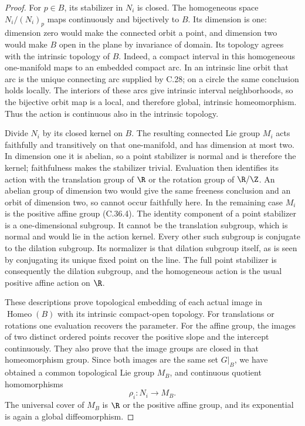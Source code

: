 \begin{proof}
For $p\in B$, its stabilizer in $N_i$ is
closed. The homogeneous space
$N_i/(N_i)_p$ maps continuously and
bijectively to $B$. Its dimension is one:
dimension zero would make the connected
orbit a point, and dimension two would make
$B$ open in the plane by invariance of
domain. Its topology agrees with the
intrinsic topology of $B$.
Indeed, a compact interval in this
homogeneous one-manifold maps to an
embedded compact arc. In an intrinsic
line orbit that arc is the unique
connecting arc supplied by C.28; on a
circle the same conclusion holds locally.
The interiors of these arcs give
intrinsic interval neighborhoods, so the
bijective orbit map is a local, and
therefore global, intrinsic homeomorphism.
Thus the action is continuous also in
the intrinsic topology.

Divide $N_i$ by its closed kernel on $B$.
The resulting connected Lie group $M_i$
acts faithfully and transitively on that
one-manifold, and has dimension at most
two. In dimension one it is abelian, so
a point stabilizer is normal and is
therefore the kernel; faithfulness makes
the stabilizer trivial. Evaluation then
identifies its action with the translation
group of $\R$ or the rotation group of
$\R/\Z$.
An abelian group of dimension two would
give the same freeness conclusion and
an orbit of dimension two, so cannot
occur faithfully here.
In the remaining case $M_i$ is the
positive affine group (C.36.4).
The identity component of a point
stabilizer is a one-dimensional subgroup.
It cannot be the translation subgroup,
which is normal and would lie in the
action kernel. Every other such subgroup
is conjugate to the dilation subgroup.
Its normalizer is that dilation subgroup
itself, as is seen by conjugating its
unique fixed point on the line.
The full point stabilizer is consequently
the dilation subgroup, and the homogeneous
action is the usual positive affine
action on $\R$.

These descriptions prove topological
embedding of each actual image in
$\operatorname{Homeo}(B)$ with its
intrinsic compact-open topology.
For translations or rotations one
evaluation recovers the parameter.
For the affine group, the images of
two distinct ordered points recover
the positive slope and the intercept
continuously. They also prove that
the image groups are closed in that
homeomorphism group.
Since both images are the same set
$G|_B$, we have obtained a common
topological Lie group $M_B$, and
continuous quotient homomorphisms
\[
                       \rho_i:N_i\longrightarrow M_B.
                                                        \tag{C.36.7}
\]
The universal cover of $M_B$ is
$\R$ or the positive affine group,
and its exponential is again a
global diffeomorphism.


\end{proof}
